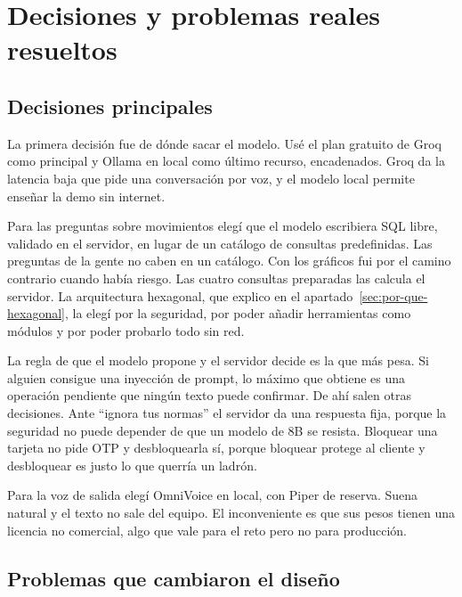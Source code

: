 \section{Decisiones y problemas reales resueltos}\label{sec:decisiones}

\subsection{Decisiones principales}\label{sec:decisiones-principales}

La primera decisión fue de dónde sacar el modelo. Usé el plan gratuito de Groq como principal y Ollama en local como
último recurso, encadenados. Groq da la latencia baja que pide una conversación por voz, y el modelo local permite
enseñar la demo sin internet.

Para las preguntas sobre movimientos elegí que el modelo escribiera SQL libre, validado en el servidor, en lugar de un
catálogo de consultas predefinidas. Las preguntas de la gente no caben en un catálogo. Con los gráficos fui por el camino
contrario cuando había riesgo. Las cuatro consultas preparadas las calcula el servidor. La arquitectura
hexagonal, que explico en el apartado~\ref{sec:por-que-hexagonal}, la elegí por la seguridad, por poder añadir
herramientas como módulos y por poder probarlo todo sin red.

La regla de que el modelo propone y el servidor decide es la que más pesa. Si alguien consigue una inyección de prompt,
lo máximo que obtiene es una operación pendiente que ningún texto puede confirmar. De ahí salen otras decisiones. Ante
``ignora tus normas'' el servidor da una respuesta fija, porque la seguridad no puede depender de que un modelo de 8B se
resista. Bloquear una tarjeta no pide OTP y desbloquearla sí, porque bloquear protege al cliente y desbloquear es justo
lo que querría un ladrón.

Para la voz de salida elegí OmniVoice en local, con Piper de reserva. Suena natural y el texto no sale del equipo. El
inconveniente es que sus pesos tienen una licencia no comercial, algo que vale para el reto pero no para producción.

\subsection{Problemas que cambiaron el diseño}\label{sec:problemas}

